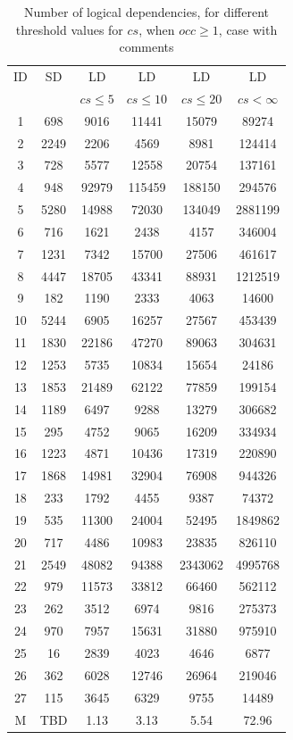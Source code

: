 \documentclass[a4paper,twoside]{article}
\begin{document}
\begin{table}[!h]
\renewcommand{\arraystretch}{1.25}
\caption{Number of logical dependencies, for different threshold values for $cs$, when $occ\geq 1$, case with comments}
\label{table:5}
\centering
\begin{tabular}{|c|c|c|c|c|c|}
\hline
ID  & SD & LD	&	LD	&	LD	&	LD \\
      &   & $cs\leq 5$	&	$cs\leq 10$	&	$cs\leq 20$	&	$cs< \infty$ \\
\hline
1	&	698	&	9016	&	11441	&	15079	&	89274	\\
2	&	2249	&	2206	&	4569	&	8981	&	124414	\\
3	&	728	&	5577	&	12558	&	20754	&	137161	\\
4	&	948	&	92979	&	115459	&	188150	&	294576	\\
5	&	5280	&	14988	&	72030	&	134049	&	2881199	\\
6	&	716	&	1621	&	2438	&	4157	&	346004	\\
7	&	1231	&	7342	&	15700	&	27506	&	461617	\\
8	&	4447	&	18705	&	43341	&	88931	&	1212519	\\
9	&	182	&	1190	&	2333	&	4063	&	14600	\\
10	&	5244	&	6905	&	16257	&	27567	&	453439	\\
11	&	1830	&	22186	&	47270	&	89063	&	304631	\\
12	&	1253	&	5735	&	10834	&	15654	&	24186	\\
13	&	1853	&	21489	&	62122	&	77859	&	199154	\\
14	&	1189	&	6497	&	9288	&	13279	&	306682	\\
15	&	295	&	4752	&	9065	&	16209	&	334934	\\
16	&	1223	&	4871	&	10436	&	17319	&	220890	\\
17	&	1868	&	14981	&	32904	&	76908	&	944326	\\
18	&	233	&	1792	&	4455	&	9387	&	74372	\\
19	&	535	&	11300	&	24004	&	52495	&	1849862	\\
20	&	717	&	4486	&	10983	&	23835	&	826110	\\
21	&	2549	&	48082	&	94388	&	2343062	&	4995768	\\
22	&	979	&	11573	&	33812	&	66460	&	562112	\\
23	&	262	&	3512	&	6974	&	9816	&	275373	\\
24	&	970	&	7957	&	15631	&	31880	&	975910	\\
25	&	16	&	2839	&	4023	&	4646	&	6877	\\
26	&	362	&	6028	&	12746	&	26964	&	219046	\\
27	&	115	&	3645	&	6329	&	9755	&	14489	\\

\hline
M	&	TBD&	1.13	&	3.13	&	5.54	&	72.96	\\
\hline
\end{tabular}
\end{table}
\end{document}
